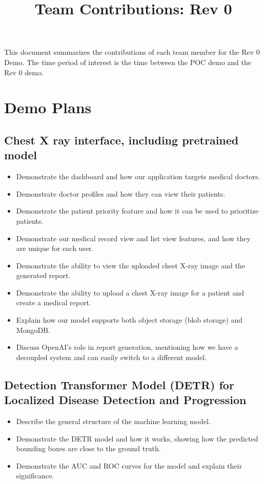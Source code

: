 \documentclass{article}
\title{Team Contributions: Rev 0\\\progname}
\author{\authname}
\date{}
\begin{document}
\maketitle

This document summarizes the contributions of each team member for the Rev 0
Demo.  The time period of interest is the time between the POC demo and the Rev
0 demo.

\section{Demo Plans}


\subsection{Chest X ray interface, including pretrained model}
\begin{itemize}
    \item Demonstrate the dashboard and how our application targets medical doctors.
    \item Demonstrate doctor profiles and how they can view their patients.
    \item Demonstrate the patient priority feature and how it can be used to prioritize patients.
    
    \item Demonstrate our medical record view and list view features, and how they are unique for each user.
    \item Demonstrate the ability to view the uploaded chest X-ray image and the generated report.
    
    \item Demonstrate the ability to upload a chest X-ray image for a patient and create a medical report. 
    \item Explain how our model supports both object storage (blob storage) and MongoDB.
    \item Discuss OpenAI’s role in report generation, mentioning how we have a decoupled system and can easily switch to a different model.

\end{itemize}

\subsection{Detection Transformer Model (DETR) for Localized Disease Detection and Progression}
\begin{itemize}
    \item Describe the general structure of the machine learning model.
    \item Demonstrate the DETR model and how it works, showing how the predicted bounding boxes are close to the ground truth.
    \item Demonstrate the AUC and ROC curves for the model and explain their significance.
\end{itemize}
\end{document}
